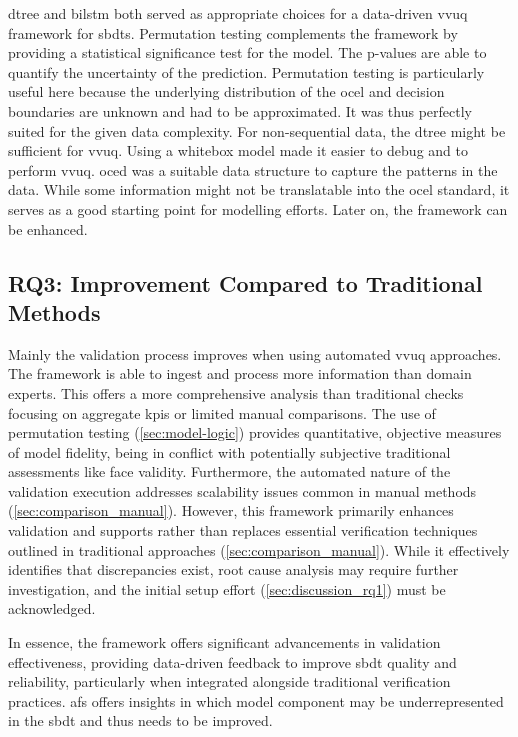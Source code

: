 \gls{dtree} and \gls{bilstm} both served as appropriate choices for a data-driven \gls{vvuq} framework for \gls{sbdt}s. Permutation testing complements the framework by providing a statistical significance test for the model. The p-values are able to quantify the uncertainty of the prediction. Permutation testing is particularly useful here because the underlying distribution of the \gls{ocel} and decision boundaries are unknown and had to be approximated. It was thus perfectly suited for the given data complexity. For non-sequential data, the \gls{dtree} might be sufficient for \gls{vvuq}. Using a whitebox model made it easier to debug and to perform \gls{vvuq}. \gls{oced} was a suitable data structure to capture the patterns in the data. While some information might not be translatable into the \gls{ocel} standard, it serves as a good starting point for modelling efforts. Later on, the framework can be enhanced.

\subsection{RQ3: Improvement Compared to Traditional Methods}
\label{sec:discussion_rq3}

Mainly the validation process improves when using automated \gls{vvuq} approaches. The framework is able to ingest and process more information than domain experts. This offers a more comprehensive analysis than traditional checks focusing on aggregate \gls{kpi}s or limited manual comparisons. The use of permutation testing (\autoref{sec:model-logic}) provides quantitative, objective measures of model fidelity, being in conflict with potentially subjective traditional assessments like face validity. Furthermore, the automated nature of the validation execution addresses scalability issues common in manual methods (\autoref{sec:comparison_manual}). However, this framework primarily enhances validation and supports rather than replaces essential verification techniques outlined in traditional approaches (\autoref{sec:comparison_manual}). While it effectively identifies that discrepancies exist, root cause analysis may require further investigation, and the initial setup effort (\autoref{sec:discussion_rq1}) must be acknowledged.

In essence, the framework offers significant advancements in validation effectiveness, providing data-driven feedback to improve \gls{sbdt} quality and reliability, particularly when integrated alongside traditional verification practices. \gls{afs} offers insights in which model component may be underrepresented in the \gls{sbdt} and thus needs to be improved.

